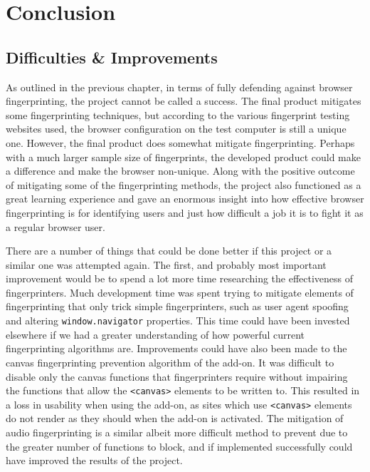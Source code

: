 \chapter{Conclusion}

\section{Difficulties \& Improvements}

As outlined in the previous chapter, in terms of fully defending against browser fingerprinting, the project cannot be called a success.
The final product mitigates some fingerprinting techniques, but according to the various fingerprint testing websites used, the browser configuration on the test computer is still a unique one.
However, the final product does somewhat mitigate fingerprinting.
Perhaps with a much larger sample size of fingerprints, the developed product could make a difference and make the browser non-unique.
Along with the positive outcome of mitigating some of the fingerprinting methods, the project also functioned as a great learning experience and gave an enormous insight into how effective browser fingerprinting is for identifying users and just how difficult a job it is to fight it as a regular browser user.

There are a number of things that could be done better if this project or a similar one was attempted again.
The first, and probably most important improvement would be to spend a lot more time researching the effectiveness of fingerprinters.
Much development time was spent trying to mitigate elements of fingerprinting that only trick simple fingerprinters, such as user agent spoofing and altering \texttt{window.navigator} properties.
This time could have been invested elsewhere if we had a greater understanding of how powerful current fingerprinting algorithms are.
Improvements could have also been made to the canvas fingerprinting prevention algorithm of the add-on.
It was difficult to disable only the canvas functions that fingerprinters require without impairing the functions that allow the \texttt{<canvas>} elements to be written to.
This resulted in a loss in usability when using the add-on, as sites which use \texttt{<canvas>} elements do not render as they should when the add-on is activated.
The mitigation of audio fingerprinting is a similar albeit more difficult method to prevent due to the greater number of functions to block, and if implemented successfully could have improved the results of the project.

